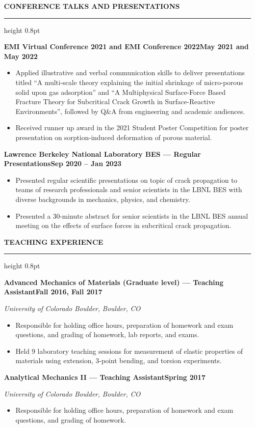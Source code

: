 \documentclass[10pt, letterpaper]{article}
\newcommand{\rsection}[1]{%
  \vspace{10pt}%
  {\large\bfseries\MakeUppercase{#1}}%
  \vspace{1pt}%
  \hrule height 0.8pt%
  \vspace{5pt}%
}
\newcommand{\jobline}[2]{%
  \vspace{5pt}%
  \noindent\textbf{#1}\hfill\textbf{#2}\par%
  \vspace{1pt}%
}
\newcommand{\subline}[1]{%
  \vspace{-1pt}%
  \noindent\textit{#1}\par%
  \vspace{1pt}%
}
\newenvironment{rlist}{%
  \begin{itemize}[leftmargin=1.4em, itemsep=1pt, topsep=2pt, parsep=0pt]%
}{%
  \end{itemize}%
}
\begin{document}
\rsection{Conference Talks and Presentations}

\jobline{EMI Virtual Conference 2021 and EMI Conference 2022}{May 2021 and May 2022}
\begin{rlist}
  \item Applied illustrative and verbal communication skills to deliver presentations titled ``A multi-scale theory explaining the initial shrinkage of micro-porous solid upon gas adsorption'' and ``A Multiphysical Surface-Force Based Fracture Theory for Subcritical Crack Growth in Surface-Reactive Environments'', followed by Q\&A from engineering and academic audiences.
  \item Received runner up award in the 2021 Student Poster Competition for poster presentation on sorption-induced deformation of porous material.
\end{rlist}

\jobline{Lawrence Berkeley National Laboratory BES --- Regular Presentations}{Sep 2020 -- Jan 2023}
\begin{rlist}
  \item Presented regular scientific presentations on topic of crack propagation to teams of research professionals and senior scientists in the LBNL BES with diverse backgrounds in mechanics, physics, and chemistry.
  \item Presented a 30-minute abstract for senior scientists in the LBNL BES annual meeting on the effects of surface forces in subcritical crack propagation.
\end{rlist}

\rsection{Teaching Experience}

\jobline{Advanced Mechanics of Materials (Graduate level) --- Teaching Assistant}{Fall 2016, Fall 2017}
\subline{University of Colorado Boulder, Boulder, CO}
\begin{rlist}
  \item Responsible for holding office hours, preparation of homework and exam questions, and grading of homework, lab reports, and exams.
  \item Held 9 laboratory teaching sessions for measurement of elastic properties of materials using extension, 3-point bending, and torsion experiments.
\end{rlist}

\jobline{Analytical Mechanics II --- Teaching Assistant}{Spring 2017}
\subline{University of Colorado Boulder, Boulder, CO}
\begin{rlist}
  \item Responsible for holding office hours, preparation of homework and exam questions, and grading of homework.
\end{rlist}
\end{document}
